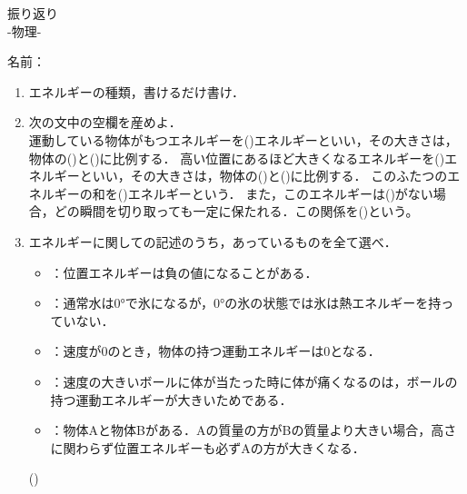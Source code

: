 \documentclass[fontsize=15pt]{jlreq}
\newcommand{\m}[1]{\raisebox{0.1em}{\textcircled{\scriptsize #1}}}
\begin{document}
\begin{center}
{\LARGE {振り返り}} \\
-物理\m{5}- %
\end{center}
\vspace{1em}
\begin{flushright}
名前：\underline{\hspace{5cm}}
\end{flushright}

\begin{enumerate}
    \item エネルギーの種類，書けるだけ書け．\\
    \vspace{3em} 

    \item 次の文中の空欄を産めよ．\\
    運動している物体がもつエネルギーを(\hspace{2cm})エネルギーといい，その大きさは，物体の(\hspace{2cm})と(\hspace{4cm})に比例する．
    高い位置にあるほど大きくなるエネルギーを(\hspace{2cm})エネルギーといい，その大きさは，物体の(\hspace{2cm})と(\hspace{2cm})に比例する．
    このふたつのエネルギーの和を(\hspace{4cm})エネルギーという．
    また，このエネルギーは(\hspace{8cm})がない場合，どの瞬間を切り取っても一定に保たれる．この関係を(\hspace{8cm})という。
    \vspace{2em} 

    \item エネルギーに関しての記述のうち，あっているものを全て選べ．
    \begin{itemize}
        \item[A]：位置エネルギーは負の値になることがある．
        \item[B]：通常水は0°で氷になるが，0°の氷の状態では氷は熱エネルギーを持っていない．
        \item[C]：速度が0のとき，物体の持つ運動エネルギーは0となる．
        \item[D] ：速度の大きいボールに体が当たった時に体が痛くなるのは，ボールの持つ運動エネルギーが大きいためである．
        \item[E] ：物体Aと物体Bがある．Aの質量の方がBの質量より大きい場合，高さに関わらず位置エネルギーも必ずAの方が大きくなる．
    \end{itemize}
    (\hspace{4cm})
\end{enumerate}
\end{document}
